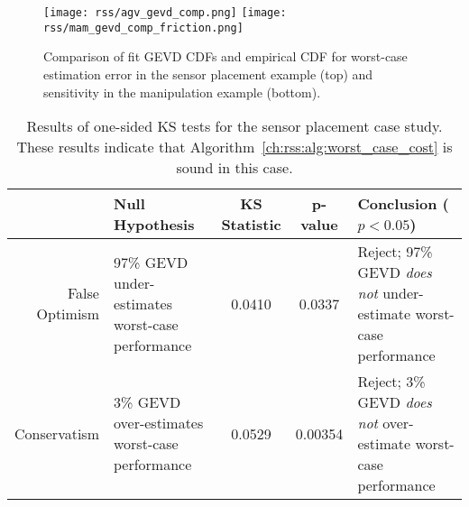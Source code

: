 \begin{figure}[tb]
    \centering
    \texttt{[image: rss/agv\_gevd\_comp.png]}
    \texttt{[image: rss/mam\_gevd\_comp\_friction.png]}
    \caption{Comparison of fit GEVD CDFs and empirical CDF for worst-case estimation error in the sensor placement example (top) and sensitivity in the manipulation example (bottom).}
    \label{ch:rss:fig:ks_test}
\end{figure}


\begin{table}[thb]
    \renewcommand{\arraystretch}{1.5}
    \centering
    \begin{tabular}{r||p{4cm}|c|c|p{5cm}}
                     & Null Hypothesis                                & \shortstack{KS                                                                                     \\ Statistic} & p-value & Conclusion ($p < 0.05$)                                                   \\ \hline\hline
        \shortstack{False                                                                                                                                                  \\Optimism} & 97\% GEVD under-estimates worst-case performance & 0.0410         & 0.0337  & Reject; 97\% GEVD \textit{does not} under-estimate worst-case performance \\ \hline
        Conservatism & 3\% GEVD over-estimates worst-case performance & 0.0529         & 0.00354 & Reject; 3\% GEVD \textit{does not} over-estimate worst-case performance
    \end{tabular}
    \caption{Results of one-sided KS tests for the sensor placement case study. These results indicate that Algorithm~\ref{ch:rss:alg:worst_case_cost} is sound in this case.}\label{ch:rss:tab:ks_test_agv}
\end{table}

